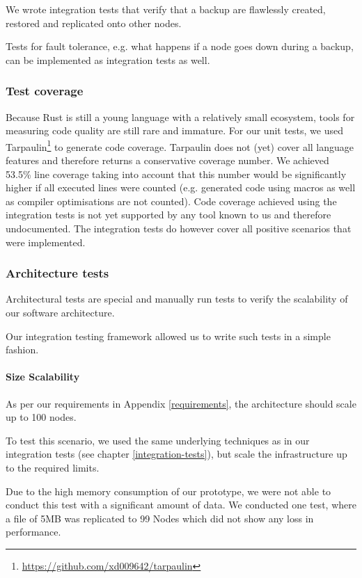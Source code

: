 We wrote integration tests that verify that a backup are flawlessly created, restored and replicated onto other \glspl{node}.

Tests for fault tolerance, e.g. what happens if a \gls{node} goes down during a backup, can be implemented as integration tests as well.

\subsubsection{Test coverage}

Because Rust is still a young language with a relatively small ecosystem, tools for measuring code quality are still rare and immature. For our unit tests, we used Tarpaulin\footnote{\url{https://github.com/xd009642/tarpaulin}} to generate code coverage. Tarpaulin does not (yet) cover all language features and therefore returns a conservative coverage number. We achieved 53.5\% line coverage taking into account that this number would be significantly higher if all executed lines were counted (e.g. generated code using macros as well as compiler optimisations are not counted).
Code coverage achieved using the integration tests is not yet supported by any tool known to us and therefore undocumented. The integration tests do however cover all positive scenarios that were implemented.

\subsubsection{Architecture tests}

Architectural tests are special and manually run tests to verify the scalability of our software architecture.

Our integration testing framework allowed us to write such tests in a simple fashion.

\paragraph{Size Scalability}
As per our requirements in Appendix \ref{requirements}, the architecture should scale up to 100 \glspl{node}.

To test this scenario, we used the same underlying techniques as in our integration tests (see chapter \ref{integration-tests}), but scale the infrastructure up to the required limits.

Due to the high memory consumption of our prototype, we were not able to conduct this test with a significant amount of data. We conducted one test, where a file of 5MB was replicated to 99 Nodes which did not show any loss in performance.

